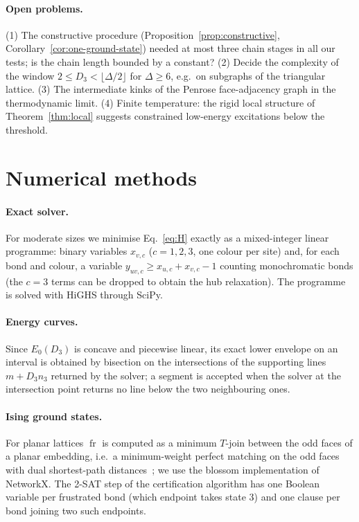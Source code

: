 \documentclass[aps,pre,twocolumn,superscriptaddress,showpacs]{revtex4-2}
\theoremstyle{definition}
\theoremstyle{remark}
\newcommand{\fr}{\operatorname{fr}}
\newcommand{\OPT}{E_0}
\begin{document}
\paragraph*{Open problems.} (1) The constructive procedure (Proposition~\ref{prop:constructive},
Corollary~\ref{cor:one-ground-state}) needed at most three chain stages in all our tests; is the
chain length bounded by a constant? (2) Decide the complexity of the window
$2\le D_3<\lfloor\Delta/2\rfloor$ for $\Delta\ge6$, e.g.\ on subgraphs of the triangular lattice.
(3) The intermediate kinks of the Penrose face-adjacency graph in the thermodynamic limit. (4) Finite temperature: the rigid local structure of
Theorem~\ref{thm:local} suggests constrained low-energy excitations below the threshold.

\appendix
\section{Numerical methods}
\label{app:numerics}
\paragraph*{Exact solver.} For moderate sizes we minimise Eq.~\eqref{eq:H} exactly as a mixed-integer
linear programme: binary variables $x_{v,c}$ ($c=1,2,3$, one colour per site) and, for each bond
and colour, a variable $y_{uv,c}\ge x_{u,c}+x_{v,c}-1$ counting monochromatic bonds (the $c=3$
terms can be dropped to obtain the hub relaxation). The programme is solved with HiGHS through
SciPy.
\paragraph*{Energy curves.} Since $\OPT(D_3)$ is concave and piecewise linear, its exact lower
envelope on an interval is obtained by bisection on the intersections of the supporting lines
$m+D_3 n_3$ returned by the solver; a segment is accepted when the solver at the intersection
point returns no line below the two neighbouring ones.
\paragraph*{Ising ground states.} For planar lattices $\fr$ is computed as a minimum $T$-join between
the odd faces of a planar embedding, i.e.\ a minimum-weight perfect matching on the odd faces with
dual shortest-path distances~\cite{Hadlock1975,Barahona1982}; we use the blossom implementation
of NetworkX. The 2-SAT step of the certification algorithm has one Boolean variable per frustrated
bond (which endpoint takes state 3) and one clause per bond joining two such endpoints.
\end{document}
